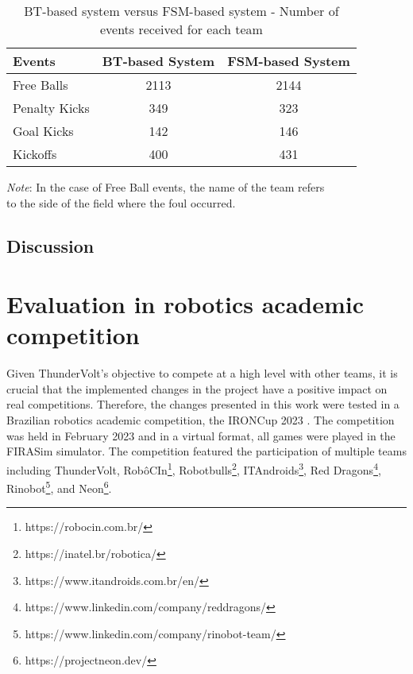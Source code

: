 \begin{table}[h]
    \begin{minipage}{\columnwidth}
        \centering
        \begin{tabular}{l c c}
            \toprule
            Events        & BT-based System & FSM-based System \\
            \midrule
            Free Balls    & 2113            & 2144             \\
            Penalty Kicks & 349             & 323              \\
            Goal Kicks    & 142             & 146              \\
            Kickoffs      & 400             & 431              \\
            \bottomrule
        \end{tabular}
        \begin{center}
            \footnotesize
            \emph{Note}: In the case of Free Ball events, the name of the team refers \\ 
            to the side of the field where the foul occurred.
        \end{center}
    \end{minipage}
    \caption{BT-based system versus FSM-based system - Number of events received for each team}
    \label{tab:fouls_count}
\end{table}

\subsection{Discussion}



\section{Evaluation in robotics academic competition}

Given ThunderVolt's objective to compete at a high level with other teams, it is crucial that the implemented changes in the project have a positive impact on real competitions. Therefore, the changes presented in this work were tested in a Brazilian robotics academic competition, the IRONCup 2023 \cite{IRONCup2023}. The competition was held in February 2023 and in a virtual format, all games were played in the FIRASim simulator. The competition featured the participation of multiple teams including ThunderVolt, RobôCIn\footnote{https://robocin.com.br/}, Robotbulls\footnote{https://inatel.br/robotica/}, ITAndroids\footnote{https://www.itandroids.com.br/en/}, Red Dragons\footnote{https://www.linkedin.com/company/reddragons/}, Rinobot\footnote{https://www.linkedin.com/company/rinobot-team/}, and Neon\footnote{https://projectneon.dev/}.

